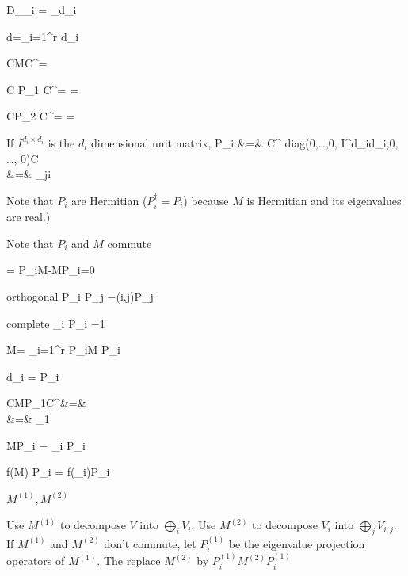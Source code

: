 \beq
D_{\lam_i} =
_{d_i}
\eeq

\beq
d=\sum_{i=1}^r d_i
\eeq


\beq
CMC^\dagger =
\eeq

\beq
C P_1 C^\dagger=
\left[
\begin{array}{cc}
1&0
\\
0&0
\end{array}
\right]
=
\eeq

\beq
CP_2 C^\dagger =
\left[
\begin{array}{cc}
0&0
\\
0&1
\end{array}
\right]
=
\eeq

If $I^{d_i\times d_i}$
is the $d_i$
dimensional unit matrix,
\beqa
P_i &=&
C^\dagger
diag(0,\ldots,0, I^{d_i\times d_i},0, \dots, 0)C
\\
&=&
\prod_{j\neq i}
\eeqa

Note that $P_i$ are Hermitian
($P_i^\dagger = P_i$)
because $M$
is Hermitian and
its eigenvalues are real.)

Note that
$P_i$ and $M$
commute

\beq
[P_i, M]=
P_iM-MP_i=0
\eeq

orthogonal
\beq
P_i P_j =\delta(i,j)P_j
\eeq

complete
\beq
\sum_i P_i =1
\eeq

\beq
M= \sum_{i=1}^r
P_iM P_i
\eeq

\beq
d_i = \tr P_i
\eeq

\beqa
CMP_1C^\dagger &=&
\left[
\begin{array}{cc}
1&0
\\
0&0
\end{array}
\right] 
\\
&=&
\lam_1
\left[
\begin{array}{cc}
1&0
\\
0&0
\end{array}
\right] 
\eeqa

\beq
MP_i = \lam_i P_i \;
\eeq

\beq
f(M) P_i = f(\lam_i)P_i \;
\eeq

$M^{(1)}, M^{(2)}$

\eeq
Use $M^{(1)}$ to decompose $V$
into $\bigoplus_i V_i$.
Use  $M^{(2)}$ to decompose $V_i$ into
$\bigoplus_j V_{i,j}$. 
If $M^{(1)}$ and $M^{(2)}$ don't
commute, let $P^{(1)}_i$ be the eigenvalue 
projection operators of $M^{(1)}$. The replace $M^{(2)}$ by $P^{(1)}_i M^{(2)}P_i^{(1)}$

\eeq

